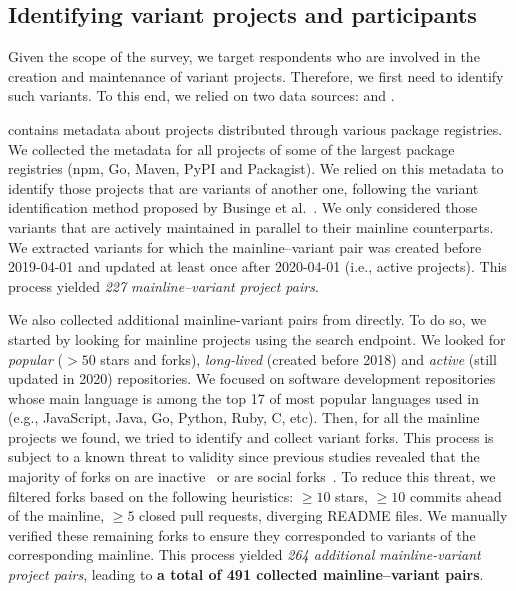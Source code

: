 

\subsection{Identifying variant projects and participants}
\label{sec:forks_and_participants}

Given the scope of the survey, we target respondents who are involved in the creation and maintenance of variant projects.
Therefore, we first need to identify such variants.
To this end, we relied on two data sources: \librariesio and \gh.

\librariesio contains metadata about projects distributed through various package registries. We collected the metadata for all projects of some of the largest package registries (\textsf{npm, Go, Maven, PyPI} and \textsf{Packagist}). We relied on this metadata to identify those projects that are variants of another one, following the variant identification method proposed by  Businge et al.~\cite{businge:emse:2021,businge:benevol:2020}. %
We only considered those variants that are actively maintained in parallel to their mainline counterparts. We extracted variants for which the mainline--variant pair was created before 2019-04-01 and updated at least once after 2020-04-01 (i.e., active projects).
This process yielded \textit{227 mainline–variant project pairs}.

We also collected additional mainline-variant pairs from \gh directly.
To do so, we started by looking for mainline projects using the \gh search endpoint. We looked for \emph{popular} ($>50$ stars and forks), \emph{long-lived} (created before 2018) and \emph{active} (still updated in 2020) repositories.
We focused on software development repositories whose main language is among the top 17 of most popular languages used in \gh (e.g., \textsf{JavaScript, Java, Go, Python, Ruby, C}, etc).
Then, for all the mainline projects we found, we tried to  identify and collect variant forks. This process is subject to a known threat to validity since previous studies revealed that the majority of forks on \gh are inactive~\cite{Businge:Android:2019,Businge:2017} or are social forks~\cite{businge:2018icsme}.
To reduce this threat, we filtered forks based on  the following heuristics: $\geq 10$ stars, $\geq 10$ commits ahead of the mainline, $\geq 5$ closed pull requests, diverging \textsf{README} files.
We manually verified these remaining forks to ensure they corresponded to variants  of the corresponding mainline.
This process yielded \textit{264 additional mainline-variant project pairs},
leading to \textbf{a total of 491 collected mainline--variant pairs}.


